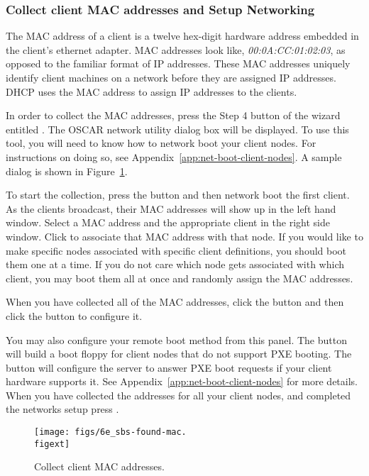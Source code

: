 \subsubsection{Collect client MAC addresses and Setup Networking} 
\label{det:setupnetwork}

The MAC address of a client
is a twelve hex-digit hardware address embedded in the client's
ethernet adapter. MAC addresses look like, \emph{00:0A:CC:01:02:03}, as
opposed to the familiar format of IP addresses. These MAC addresses
uniquely identify client machines on a network before they are
assigned IP addresses. DHCP uses the MAC address to assign IP 
addresses to the clients.

In order to collect the MAC addresses,  press the Step 4 button
of the wizard entitled . The
OSCAR network utility dialog box will be displayed.
To use this tool, you will need to know
how to network boot your client nodes.  For instructions on doing
so, see Appendix~\ref{app:net-boot-client-nodes}. A sample dialog
is shown in Figure~\ref{fig:detailed-collect-mac}. 

To start the collection, press the  button and then
network boot the first client.  As the clients broadcast, their MAC addresses
will show up in the left hand window. Select a MAC address and the appropriate
client in the right side window. Click  to 
associate that MAC address with that node. If you would like to make 
specific nodes associated with specific client definitions, you should
boot them one at a time. If you do not care which node gets associated
with which client, you may boot them all at once and randomly assign
the MAC addresses.

When you have collected all of the MAC addresses, click the 
button and then click the  button to configure it.
 
You may also configure your remote boot method from this panel. The
 button will build a boot floppy for
client nodes that do not support PXE booting. The  button will configure the server to answer PXE boot requests if
your client hardware supports it. See Appendix~\ref{app:net-boot-client-nodes}
for more details.
When you have collected the
addresses for all your client nodes, and completed the networks setup
press .

\begin{figure}[htbp]
  \begin{center}
    \texttt{[image: figs/6e\_sbs-found-mac.\\figext]}
    \caption{Collect client MAC addresses.}
    \label{fig:detailed-collect-mac}
  \end{center}
\end{figure}

